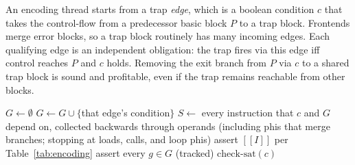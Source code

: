 \documentclass[acmsmall,screen,nonacm]{acmart}
\newcommand{\den}[1]{[\![#1]\!]}
\begin{document}
An encoding thread starts from a trap \emph{edge}, which is a boolean condition $c$ that takes the control-flow from a predecessor basic block $P$ to a trap block. Frontends merge error blocks, so a trap block routinely has many incoming
edges. Each qualifying edge is an independent obligation: the trap fires via this edge
iff control reaches $P$ and $c$ holds. Removing the exit branch from $P$ via $c$ to a shared trap block is sound
and profitable, even if the trap remains reachable from other blocks.

\begin{algorithm}[t]
\caption{Encoding and deciding one trap edge $(P, c)$}
\label{alg:encode}
\small
\begin{algorithmic}[1]
\State $G \gets \emptyset$ 
    $G \gets G \cup \{$that edge's condition$\}$
  \EndIf
\EndFor
\State $S \gets$ every instruction that $c$ and $G$ depend on, collected
  backwards through operands 
\Statex \hspace{\algorithmicindent} (including phis that merge branches; stopping at loads, calls,
  and loop phis)
  \State assert $\den{I}$ per Table~\ref{tab:encoding}
\EndFor
\State assert every $g \in G$ (tracked)
\State \Return $\mathrm{check\mbox{-}sat}(c)$
\end{algorithmic}
\end{algorithm}
\end{document}
